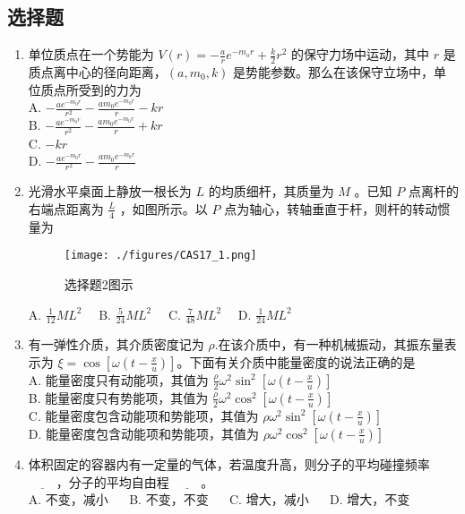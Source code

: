 

\subsection{选择题}
\begin{enumerate}
\item 单位质点在一个势能为 $V(r) = -\frac{a}{r}e^{-m_{o}r}+\frac{k}{2}r^{2}$ 的保守力场中运动，其中 $r$ 是质点离中心的径向距离，$(a,m_{0},k)$ 是势能参数。那么在该保守立场中，单位质点所受到的力为\\
A. $-\frac{ae^{-m_{0}r}}{r^{2}}-\frac{am_{0}e^{-m_{0}r}}{r}-kr$\\
B. $-\frac{ae^{-m_{0}r}}{r^{2}}-\frac{am_{0}e^{-m_{0}r}}{r}+kr$\\
C. $-kr$\\
D. $-\frac{ae^{-m_{0}r}}{r^{2}}-\frac{am_{0}e^{-m_{0}r}}{r}$\\

\item 光滑水平桌面上静放一根长为 $L$ 的均质细杆，其质量为 $M$ 。已知 $P$ 点离杆的右端点距离为 $\frac{L}{4}$ ，如图所示。以 $P$ 点为轴心，转轴垂直于杆，则杆的转动惯量为\\
\begin{figure}[ht]
\centering
\texttt{[image: ./figures/CAS17\_1.png]}
\caption{选择题2图示} \label{CAS17_fig1}
\end{figure}
A. $\frac{1}{12}ML^{2} \quad$
B. $\frac{5}{24}ML^{2} \quad$
C. $\frac{7}{48}ML^{2} \quad$
D. $\frac{1}{24}ML^{2} \quad$

\item 有一弹性介质，其介质密度记为 $\rho$.在该介质中，有一种机械振动，其振东量表示为 $\xi = \cos{[\omega(t-\frac{x}{u})]}$。下面有关介质中能量密度的说法正确的是\\
A. 能量密度只有动能项，其值为 $\frac{\rho}{2}\omega^{2}\sin^{2}{[\omega(t-\frac{x}{u})]}$\\
B. 能量密度只有势能项，其值为 $\frac{\rho}{2}\omega^{2}\cos^{2}{[\omega(t-\frac{x}{u})]}$\\
C. 能量密度包含动能项和势能项，其值为 $\rho\omega^{2}\sin^{2}{[\omega(t-\frac{x}{u})]}$\\
D. 能量密度包含动能项和势能项，其值为 $\rho\omega^{2}\cos^{2}{[\omega(t-\frac{x}{u})]}$\\

\item 体积固定的容器内有一定量的气体，若温度升高，则分子的平均碰撞频率 $\underline{~~~~~~~~~~}$，分子的平均自由程 $\underline{~~~~~~~~~~}$。\\
A. 不变，减小 $\quad$
B. 不变，不变 $\quad$
C. 增大，减小 $\quad$
D. 增大，不变 $\quad$


\end{enumerate}
